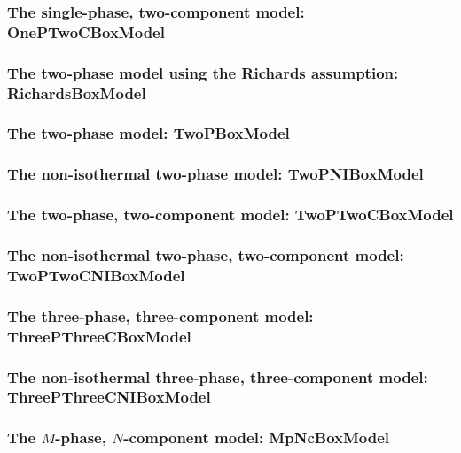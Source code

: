 \subsubsection{The single-phase, two-component model:  OnePTwoCBoxModel} 


\subsubsection{The two-phase model using the Richards assumption: RichardsBoxModel} 


\subsubsection{The two-phase model: TwoPBoxModel}


\subsubsection{The non-isothermal two-phase model: TwoPNIBoxModel} 


\subsubsection{The two-phase, two-component model: TwoPTwoCBoxModel} 


\subsubsection{The non-isothermal two-phase, two-component model: TwoPTwoCNIBoxModel} 


\subsubsection{The three-phase, three-component model: ThreePThreeCBoxModel}


\subsubsection{The non-isothermal three-phase, three-component model: ThreePThreeCNIBoxModel} 


\subsubsection{The $M$-phase, $N$-component model: MpNcBoxModel} 


